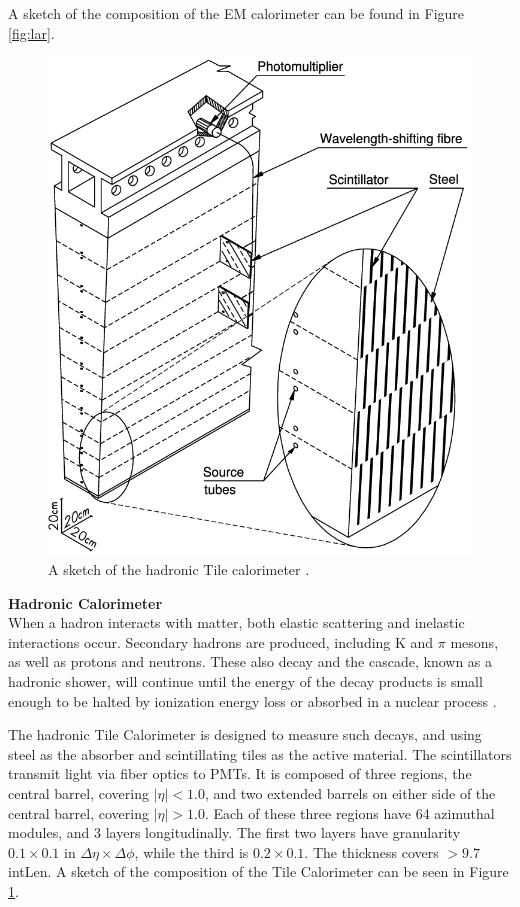 A sketch of the composition of the \gls{EM} calorimeter can be found in Figure \ref{fig:lar}.

\begin{figure}
    \centering
    \includegraphics[width=.7\textwidth]{chapters/chapter2_experiment/images/tile.png}
    \caption{A sketch of the hadronic Tile calorimeter \cite{tile-tdr}.}
    \label{fig:tile}
\end{figure}


\noindent\textbf{Hadronic Calorimeter}\\ 
\indent When a hadron interacts with matter, both elastic scattering and inelastic interactions occur. Secondary hadrons are produced, including K and $\pi$ mesons, as well as protons and neutrons. These also decay and the cascade, known as a hadronic shower, will continue until the energy of the decay products is small enough to be halted by ionization energy loss or absorbed in a nuclear process \cite{detectors-for-radiation}.

\indent The hadronic Tile Calorimeter is designed to measure such decays, and using steel as the absorber and scintillating tiles as the active material. The scintillators transmit light via fiber optics to \glspl{PMT}. It is composed of three regions, the central barrel, covering $|\eta| < 1.0$, and two extended barrels on either side of the central barrel, covering $|\eta| > 1.0$. Each of these three regions have 64 azimuthal modules, and 3 layers longitudinally. The first two layers have granularity $0.1 \times 0.1$ in $\Delta\eta \times \Delta \phi$, while the third is $0.2 \times 0.1$. The thickness covers $>9.7$ \gls{intLen}. A sketch of the composition of the Tile Calorimeter can be seen in Figure \ref{fig:tile}.

